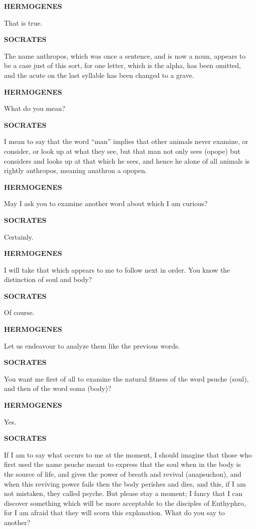 \documentclass[11pt,letter]{article}
\begin{document}
\par \textbf{HERMOGENES}
\par   That is true.

\par \textbf{SOCRATES}
\par   The name anthropos, which was once a sentence, and is now a noun, appears to be a case just of this sort, for one letter, which is the alpha, has been omitted, and the acute on the last syllable has been changed to a grave.

\par \textbf{HERMOGENES}
\par   What do you mean?

\par \textbf{SOCRATES}
\par   I mean to say that the word “man” implies that other animals never examine, or consider, or look up at what they see, but that man not only sees (opope) but considers and looks up at that which he sees, and hence he alone of all animals is rightly anthropos, meaning anathron a opopen.

\par \textbf{HERMOGENES}
\par   May I ask you to examine another word about which I am curious?

\par \textbf{SOCRATES}
\par   Certainly.

\par \textbf{HERMOGENES}
\par   I will take that which appears to me to follow next in order. You know the distinction of soul and body?

\par \textbf{SOCRATES}
\par   Of course.

\par \textbf{HERMOGENES}
\par   Let us endeavour to analyze them like the previous words.

\par \textbf{SOCRATES}
\par   You want me first of all to examine the natural fitness of the word psuche (soul), and then of the word soma (body)?

\par \textbf{HERMOGENES}
\par   Yes.

\par \textbf{SOCRATES}
\par   If I am to say what occurs to me at the moment, I should imagine that those who first used the name psuche meant to express that the soul when in the body is the source of life, and gives the power of breath and revival (anapsuchon), and when this reviving power fails then the body perishes and dies, and this, if I am not mistaken, they called psyche. But please stay a moment; I fancy that I can discover something which will be more acceptable to the disciples of Euthyphro, for I am afraid that they will scorn this explanation. What do you say to another?
\end{document}
